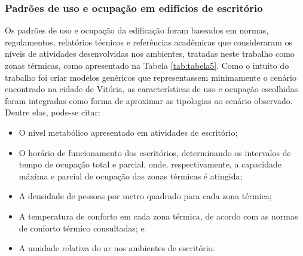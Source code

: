 \subsubsection{Padrões de uso e ocupação em edifícios de escritório}
Os padrões de uso e ocupação da edificação foram baseados em normas, regulamentos, relatórios técnicos e referências acadêmicas que consideraram os níveis de atividades desenvolvidas nos ambientes, tratadas neste trabalho como zonas térmicas, como apresentado na Tabela \ref{tab:tabela5}.\vspace*{0.3cm} \newline
Como o intuito do trabalho foi criar modelos genéricos que representassem minimamente o cenário encontrado na cidade de Vitória, as características de uso e ocupação escolhidas foram integradas como forma de aproximar as tipologias ao cenário observado. Dentre elas, pode-se citar:
\begin{itemize}
    \item O nível metabólico apresentado em atividades de escritório;
    \item O horário de funcionamento dos escritórios, determinando os intervalos de tempo de ocupação total e parcial, onde, respectivamente, a capacidade máxima e parcial de ocupação das zonas térmicas é atingida;
    \item A densidade de pessoas por metro quadrado para cada zona térmica;
    \item A temperatura de conforto em cada zona térmica, de acordo com as normas de conforto térmico consultadas; e
    \item A umidade relativa do ar nos ambientes de escritório.
\end{itemize}

